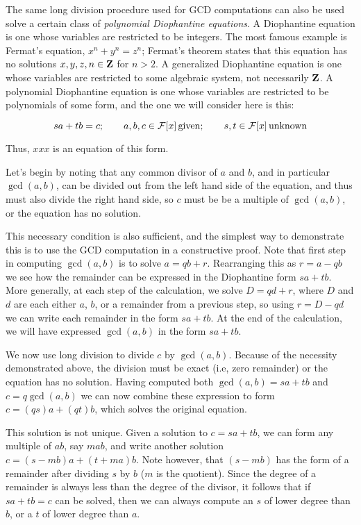 \endexample

\vfill\eject


The same long division procedure used for GCD computations can also be
used solve a certain class of {\it polynomial Diophantine equations}.
A Diophantine equation is one whose variables are restricted to be
integers.  The most famous example is Fermat's equation,
$x^n+y^n=z^n$; Fermat's theorem states that this equation has no
solutions $x,y,z,n\in{\bf Z}$ for $n>2$.  A generalized Diophantine
equation is one whose variables are restricted to some algebraic
system, not necessarily ${\bf Z}$.  A polynomial Diophantine equation
is one whose variables are restricted to be polynomials of some form,
and the one we will consider here is this:

\begin{displaymath}
sa+tb=c; \qquad a,b,c\in{\cal F}[x] {\rm\, given}; \qquad
s,t\in{\cal F}[x] {\rm\, unknown}
\end{displaymath}

Thus, $xxx$ is an equation of this form.

Let's begin by noting that any common divisor of $a$ and $b$, and in
particular $\gcd(a,b)$, can be divided out from the left hand side of
the equation, and thus must also divide the right hand side, so $c$
must be be a multiple of $\gcd(a,b)$, or the equation has no solution.

This necessary condition is also sufficient, and the simplest way to
demonstrate this is to use the GCD computation in a constructive
proof.  Note that first step in computing $\gcd(a,b)$ is to solve
$a=qb+r$.  Rearranging this as $r=a-qb$ we see how the remainder can
be expressed in the Diophantine form $sa+tb$.  More generally, at each
step of the calculation, we solve $D=qd+r$, where $D$ and $d$ are each
either $a$, $b$, or a remainder from a previous step, so using
$r=D-qd$ we can write each remainder in the form $sa+tb$.  At the end
of the calculation, we will have expressed $\gcd(a,b)$ in the form
$sa+tb$.

We now use long division to divide $c$ by $\gcd(a,b)$.  Because of the
necessity demonstrated above, the division must be exact (i.e, zero
remainder) or the equation has no solution.  Having computed both
$\gcd(a,b)=sa+tb$ and $c=q\gcd(a,b)$ we can now combine these
expression to form $c=(qs)a+(qt)b$, which solves the original
equation.

This solution is not unique.  Given a solution to $c=sa+tb$, we can
form any multiple of $ab$, say $mab$, and write another solution
$c=(s-mb)a+(t+ma)b$.  Note however, that $(s-mb)$ has the form of a
remainder after dividing $s$ by $b$ ($m$ is the quotient).  Since the
degree of a remainder is always less than the degree of the divisor,
it follows that if $sa+tb=c$ can be solved, then we can always compute
an $s$ of lower degree than $b$, or a $t$ of lower degree than $a$.

